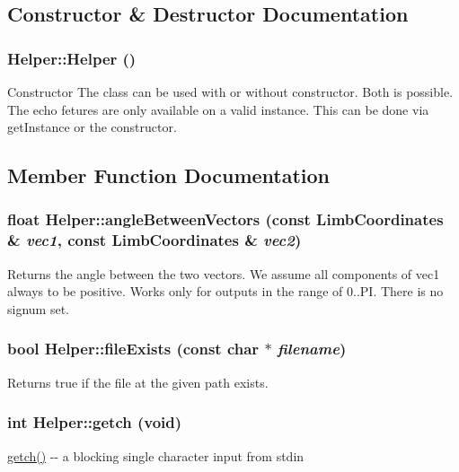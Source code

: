 \subsection{Constructor \& Destructor Documentation}
\hypertarget{classHelper_a59924530b7cfbc3d32134a1cf5de2a56}{
\subsubsection[{Helper}]{\setlength{\rightskip}{0pt plus 5cm}Helper::Helper ()}}
\label{classHelper_a59924530b7cfbc3d32134a1cf5de2a56}
Constructor The class can be used with or without constructor. Both is possible. The echo fetures are only available on a valid instance. This can be done via getInstance or the constructor. 

\subsection{Member Function Documentation}
\hypertarget{classHelper_a8247553942b803f8a9a9598c5543c4a2}{
\subsubsection[{angleBetweenVectors}]{\setlength{\rightskip}{0pt plus 5cm}float Helper::angleBetweenVectors (const {\bf LimbCoordinates} \& {\em vec1}, \/  const {\bf LimbCoordinates} \& {\em vec2})}}
\label{classHelper_a8247553942b803f8a9a9598c5543c4a2}
Returns the angle between the two vectors. We assume all components of vec1 always to be positive. Works only for outputs in the range of 0..PI. There is no signum set. \hypertarget{classHelper_a2ba49d32f8786d3ce542430fcad21c4b}{
\subsubsection[{fileExists}]{\setlength{\rightskip}{0pt plus 5cm}bool Helper::fileExists (const char $\ast$ {\em filename})}}
\label{classHelper_a2ba49d32f8786d3ce542430fcad21c4b}
Returns true if the file at the given path exists. \hypertarget{classHelper_af310a6096bddd62349e079a38c1cb262}{
\subsubsection[{getch}]{\setlength{\rightskip}{0pt plus 5cm}int Helper::getch (void)}}
\label{classHelper_af310a6096bddd62349e079a38c1cb262}
\hyperlink{classHelper_af310a6096bddd62349e079a38c1cb262}{getch()} -\/-\/ a blocking single character input from stdin

